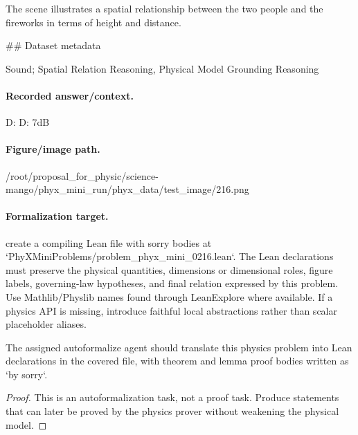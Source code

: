 The scene illustrates a spatial relationship between the two people and the fireworks in terms of height and distance.

\#\# Dataset metadata

Sound; Spatial Relation Reasoning, Physical Model Grounding Reasoning

\paragraph{Recorded answer/context.}
D: D: 7dB

\paragraph{Figure/image path.}
/root/proposal\_for\_physic/science-mango/phyx\_mini\_run/phyx\_data/test\_image/216.png

\paragraph{Formalization target.}
create a compiling Lean file with sorry bodies at `PhyXMiniProblems/problem\_phyx\_mini\_0216.lean`. The Lean declarations must preserve the physical quantities, dimensions or dimensional roles, figure labels, governing-law hypotheses, and final relation expressed by this problem.
Use Mathlib/Physlib names found through LeanExplore where available. If a physics API is missing, introduce faithful local abstractions rather than scalar placeholder aliases.

\begin{theorem}
\label{thm:physics:phyx_mini_0216:target}
The assigned autoformalize agent should translate this physics problem into Lean declarations in the covered file, with theorem and lemma proof bodies written as `by sorry`.
\end{theorem}
\begin{proof}
This is an autoformalization task, not a proof task. Produce statements that can later be proved by the physics prover without weakening the physical model.
\end{proof}

